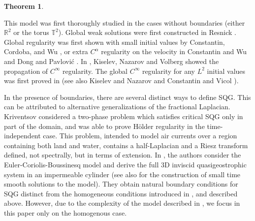 \documentclass[11pt]{amsart}
\newtheorem{theorem}{Theorem}[section]
\theoremstyle{remark}
\theoremstyle{definition}
\newcommand{\R}{\mathbb{R}}
\newcommand{\T}{\mathbb{T}}
\newcommand{\norm}[1]{\left\lVert#1\right\rVert}
\begin{document}
\begin{theorem}
\end{theorem}

This model was first thoroughly studied in the cases without boundaries (either $\R^2$ or the torus $\T^2$).   
Global weak solutions were first constructed in Resnick \cite{Re}. Global regularity was first shown with small initial values by Constantin, Cordoba, and Wu \cite{CoCoWu}, or extra $C^\alpha$ regularity on the velocity in Constantin and Wu \cite{CoWu} and Dong and Pavlovi\'{c} \cite{DoPa}. In \cite{KiNaVo}, Kiselev, Nazarov and Volberg showed the 
propagation of $C^\infty$ regularity. The global $C^\infty$ regularity for any $L^2$ initial values was first proved in  \cite{CaVa.sqg} (see also Kiselev and Nazarov \cite{KiNa.variations} and Constantin and Vicol \cite{CoVi}).   

\vskip0.3cm

In the presence of boundaries, there are several  distinct ways to define SQG. This can be attributed  to alternative generalizations of the fractional Laplacian.  Kriventsov \cite{Kr} considered a two-phase problem which satisfies critical SQG only in part of the domain, and was able to prove H\"{o}lder regularity in the time-independent case.  This problem, intended to model air currents over a region containing both land and water, contains a half-Laplacian and a Riesz transform defined, not spectrally, but in terms of extension.  In \cite{NoVa.bounded}, the authors consider the Euler-Coriolis-Boussinesq model and derive the full 3D inviscid quasigeostrophic system in an impermeable cylinder (see also \cite{NoVa.solutions} for the construction of small time smooth solutions to the model).  They obtain natural boundary conditions for SQG distinct from the homogeneous conditions introduced in \cite{CoIg.fraclap}, \cite{CoIg.sqg} and described above. 
However, due to the complexity of the model described in \cite{NoVa.bounded}, we focus in this paper only on the homogenous case.
\end{document}
